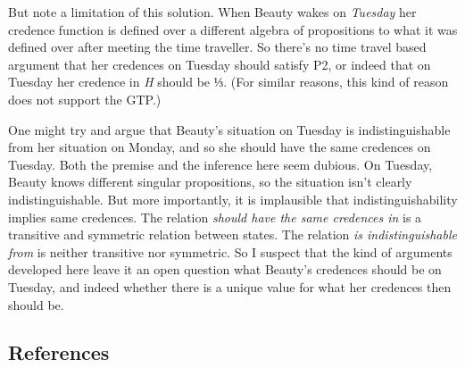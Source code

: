 \documentclass[
  11pt,
  letterpaper,
  DIV=11,
  numbers=noendperiod,
  twoside]{scrartcl}
\begin{document}
But note a limitation of this solution. When Beauty wakes on
\emph{Tuesday} her credence function is defined over a different algebra
of propositions to what it was defined over after meeting the time
traveller. So there's no time travel based argument that her credences
on Tuesday should satisfy P2, or indeed that on Tuesday her credence in
\emph{H} should be ⅓. (For similar reasons, this kind of reason does not
support the GTP.)

One might try and argue that Beauty's situation on Tuesday is
indistinguishable from her situation on Monday, and so she should have
the same credences on Tuesday. Both the premise and the inference here
seem dubious. On Tuesday, Beauty knows different singular propositions,
so the situation isn't clearly indistinguishable. But more importantly,
it is implausible that indistinguishability implies same credences. The
relation \emph{should have the same credences in} is a transitive and
symmetric relation between states. The relation \emph{is
indistinguishable from} is neither transitive nor symmetric. So I
suspect that the kind of arguments developed here leave it an open
question what Beauty's credences should be on Tuesday, and indeed
whether there is a unique value for what her credences then should be.

\subsection*{References}\label{references}
\end{document}
